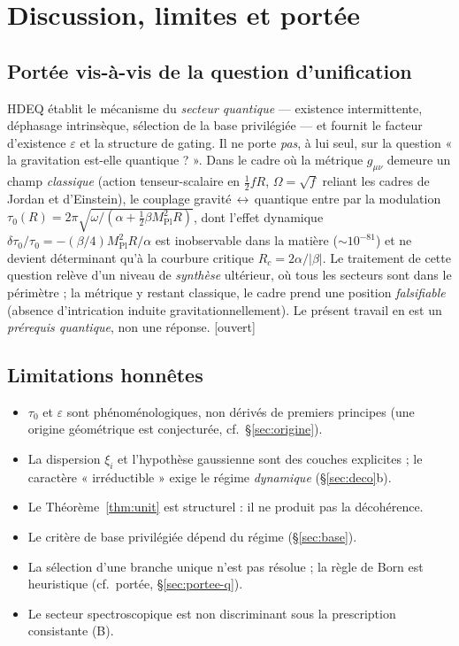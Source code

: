 \documentclass[11pt,a4paper]{article}
\newcommand{\statut}[1]{{\footnotesize\textsf{[#1]}}}
\theoremstyle{plain}
\theoremstyle{definition}
\theoremstyle{remark}
\begin{document}
\section{Discussion, limites et port\'ee}
\subsection{Port\'ee vis-\`a-vis de la question d'unification}
HDEQ \'etablit le m\'ecanisme du \emph{secteur quantique} --- existence
intermittente, d\'ephasage intrins\`eque, s\'election de la base privil\'egi\'ee --- et
fournit le facteur d'existence $\varepsilon$ et la structure de gating. Il ne
porte \emph{pas}, \`a lui seul, sur la question « la gravitation est-elle
quantique ? ». Dans le cadre o\`u la m\'etrique $g_{\mu\nu}$ demeure un champ
\emph{classique} (action tenseur-scalaire en $\tfrac12 fR$, $\Omega=\sqrt f$
reliant les cadres de Jordan et d'Einstein), le couplage gravit\'e$\,\leftrightarrow\,$quantique
entre par la modulation $\tau_0(R)=2\pi\sqrt{\omega/(\alpha+\tfrac12\beta
M_{\mathrm{Pl}}^2 R)}$, dont l'effet dynamique
$\delta\tau_0/\tau_0=-(\beta/4)M_{\mathrm{Pl}}^2 R/\alpha$ est inobservable dans
la mati\`ere ($\sim10^{-81}$) et ne devient d\'eterminant qu'\`a la courbure critique
$R_c=2\alpha/|\beta|$. Le traitement de cette question rel\`eve d'un niveau de
\emph{synth\`ese} ult\'erieur, o\`u tous les secteurs sont dans le p\'erim\`etre ; la
m\'etrique y restant classique, le cadre prend une position \emph{falsifiable} (absence
d'intrication induite gravitationnellement). Le pr\'esent travail en est un
\emph{pr\'erequis quantique}, non une r\'eponse. \statut{ouvert}

\subsection{Limitations honn\^etes}
\begin{itemize}
\item $\tau_0$ et $\varepsilon$ sont ph\'enom\'enologiques, non d\'eriv\'es de premiers principes (une origine g\'eom\'etrique est conjectur\'ee, cf.\ \S\ref{sec:origine}).
\item La dispersion $\xi_i$ et l'hypoth\`ese gaussienne sont des couches explicites ; le caract\`ere « irr\'eductible » exige le r\'egime \emph{dynamique} (\S\ref{sec:deco}b).
\item Le Th\'eor\`eme~\ref{thm:unit} est structurel : il ne produit pas la d\'ecoh\'erence.
\item Le crit\`ere de base privil\'egi\'ee d\'epend du r\'egime (\S\ref{sec:base}).
\item La s\'election d'une branche unique n'est pas r\'esolue ; la r\`egle de Born est heuristique (cf.\ port\'ee, \S\ref{sec:portee-q}).
\item Le secteur spectroscopique est non discriminant sous la prescription consistante (B).
\end{itemize}
\end{document}
